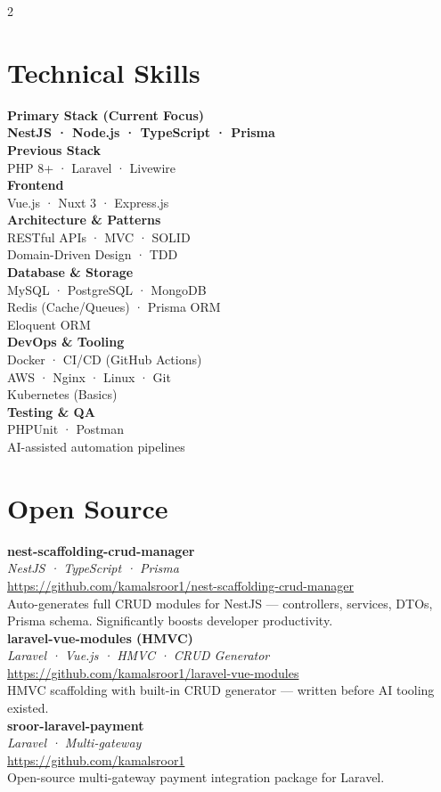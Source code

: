 \documentclass[10pt, a4paper]{article}
\newcommand{\slabel}[1]{{\small\bfseries\color{Dark}#1}\\[1pt]}
\newcommand{\sval}[1]{{\small\color{Mid}#1}\\[7pt]}
\newcommand{\oss}[4]{%
  {\small\bfseries\color{Dark}#1}\\[1pt]%
  {\footnotesize\itshape\color{Light}#2}\\[1pt]%
  \href{#3}{\footnotesize\color{Blue}#3}\\[2pt]%
  {\small\color{Mid}#4}\\[8pt]%
}
\begin{document}
\begin{paracol}{2}
\switchcolumn

\section{Technical Skills}

\slabel{Primary Stack (Current Focus)}
{\small\bfseries\color{Blue}NestJS · Node.js · TypeScript · Prisma}\\[8pt]

\slabel{Previous Stack}
\sval{PHP 8+ · Laravel · Livewire}

\slabel{Frontend}
\sval{Vue.js · Nuxt 3 · Express.js}

\slabel{Architecture \& Patterns}
\sval{RESTful APIs · MVC · SOLID\\Domain-Driven Design · TDD}

\slabel{Database \& Storage}
\sval{MySQL · PostgreSQL · MongoDB\\Redis (Cache/Queues) · Prisma ORM\\Eloquent ORM}

\slabel{DevOps \& Tooling}
\sval{Docker · CI/CD (GitHub Actions)\\AWS · Nginx · Linux · Git\\Kubernetes (Basics)}

\slabel{Testing \& QA}
\sval{PHPUnit · Postman\\AI-assisted automation pipelines}

\section{Open Source}

\oss{nest-scaffolding-crud-manager}%
    {NestJS · TypeScript · Prisma}%
    {https://github.com/kamalsroor1/nest-scaffolding-crud-manager}%
    {Auto-generates full CRUD modules for NestJS — controllers, services, DTOs, Prisma schema. Significantly boosts developer productivity.}

\oss{laravel-vue-modules (HMVC)}%
    {Laravel · Vue.js · HMVC · CRUD Generator}%
    {https://github.com/kamalsroor1/laravel-vue-modules}%
    {HMVC scaffolding with built-in CRUD generator — written before AI tooling existed.}

\oss{sroor-laravel-payment}%
    {Laravel · Multi-gateway}%
    {https://github.com/kamalsroor1}%
    {Open-source multi-gateway payment integration package for Laravel.}


\end{paracol}
\end{document}
